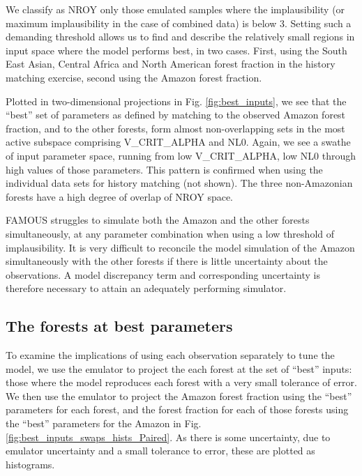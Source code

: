 \documentclass[esd, article]{copernicus} %
\begin{document}
We classify as NROY only those emulated samples where the implausibility (or maximum implausibility in the case of combined data) is below 3. Setting such a demanding threshold allows us to find and describe the relatively small regions in input space where the model performs best, in two cases. First, using the South East Asian, Central Africa and North American forest fraction in the history matching exercise, second using the Amazon forest fraction.


Plotted in two-dimensional projections in Fig.  \ref{fig:best_inputs}, we see that the ``best'' set of parameters as defined by matching to the observed Amazon forest fraction, and to the other forests, form almost non-overlapping sets in the most active subspace comprising V\_CRIT\_ALPHA and NL0. Again, we see a swathe of input parameter space, running from low V\_CRIT\_ALPHA, low NL0 through high values of those parameters. This pattern is confirmed when using the individual data sets for history matching (not shown). The three non-Amazonian forests have a high degree of overlap of NROY space.

FAMOUS struggles to simulate both the Amazon and the other forests simultaneously, at any parameter combination when using a low threshold of implausibility.  It is very difficult to reconcile the model simulation of the Amazon simultaneously with the other forests if there is little uncertainty about the observations. A model discrepancy term and corresponding uncertainty is therefore necessary to attain an adequately performing simulator.


\subsection{The forests at best parameters}\label{ssec:bestparameters}
To examine the implications of using each observation separately to tune the model, we use the emulator to project the each forest at the set of ``best'' inputs: those where the model reproduces each forest with a very small tolerance of error. We then use the emulator to project the Amazon forest fraction using the ``best'' parameters for each forest, and the forest fraction for each of those forests using the ``best'' parameters for the Amazon in Fig. \ref{fig:best_inputs_swaps_hists_Paired}. As there is some uncertainty, due to emulator uncertainty and a small tolerance to error, these are plotted as histograms.
\end{document}
